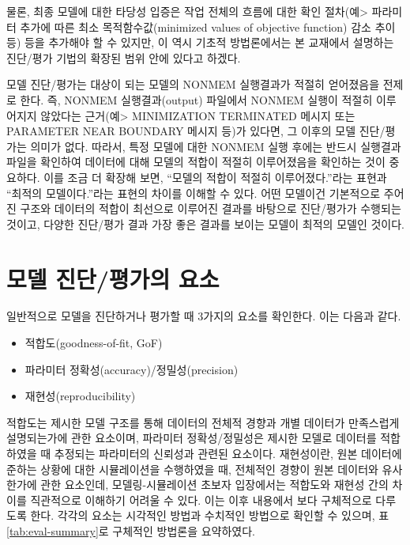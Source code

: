 \documentclass[
  10pt,
  krantz2,
  a4paper]{krantz}
\providecommand{\tightlist}{%
  \setlength{\itemsep}{0pt}\setlength{\parskip}{0pt}}
\theoremstyle{definition}
\theoremstyle{definition}
\theoremstyle{definition}
\theoremstyle{remark}
\begin{document}
물론, 최종 모델에 대한 타당성 입증은 작업 전체의 흐름에 대한 확인 절차(예\textgreater{} 파라미터 추가에 따른 최소 목적함수값(minimized values of objective function) 감소 추이 등) 등을 추가해야 할 수 있지만, 이 역시 기초적 방법론에서는 본 교재에서 설명하는 진단/평가 기법의 확장된 범위 안에 있다고 하겠다.

모델 진단/평가는 대상이 되는 모델의 NONMEM 실행결과가 적절히 얻어졌음을 전제로 한다. 즉, NONMEM 실행결과(output) 파일에서 NONMEM 실행이 적절히 이루어지지 않았다는 근거(예\textgreater{} MINIMIZATION TERMINATED 메시지 또는 PARAMETER NEAR BOUNDARY 메시지 등)가 있다면, 그 이후의 모델 진단/평가는 의미가 없다. 따라서, 특정 모델에 대한 NONMEM 실행 후에는 반드시 실행결과 파일을 확인하여 데이터에 대해 모델의 적합이 적절히 이루어졌음을 확인하는 것이 중요하다. 이를 조금 더 확장해 보면, ``모델의 적합이 적절히 이루어졌다.''라는 표현과 ``최적의 모델이다.''라는 표현의 차이를 이해할 수 있다. 어떤 모델이건 기본적으로 주어진 구조와 데이터의 적합이 최선으로 이루어진 결과를 바탕으로 진단/평가가 수행되는 것이고, 다양한 진단/평가 결과 가장 좋은 결과를 보이는 모델이 최적의 모델인 것이다.

\hypertarget{uxbaa8uxb378-uxc9c4uxb2e8uxd3c9uxac00uxc758-uxc694uxc18c}{%
\section{모델 진단/평가의 요소}\label{uxbaa8uxb378-uxc9c4uxb2e8uxd3c9uxac00uxc758-uxc694uxc18c}}

일반적으로 모델을 진단하거나 평가할 때 3가지의 요소를 확인한다. 이는 다음과 같다.

\begin{itemize}
\tightlist
\item
  적합도(goodness-of-fit, GoF)
\item
  파라미터 정확성(accuracy)/정밀성(precision)
\item
  재현성(reproducibility)
\end{itemize}

적합도는 제시한 모델 구조를 통해 데이터의 전체적 경향과 개별 데이터가 만족스럽게 설명되는가에 관한 요소이며, 파라미터 정확성/정밀성은 제시한 모델로 데이터를 적합하였을 때 추정되는 파라미터의 신뢰성과 관련된 요소이다. 재현성이란, 원본 데이터에 준하는 상황에 대한 시뮬레이션을 수행하였을 때, 전체적인 경향이 원본 데이터와 유사한가에 관한 요소인데, 모델링-시뮬레이션 초보자 입장에서는 적합도와 재현성 간의 차이를 직관적으로 이해하기 어려울 수 있다. 이는 이후 내용에서 보다 구체적으로 다루도록 한다. 각각의 요소는 시각적인 방법과 수치적인 방법으로 확인할 수 있으며, 표 \ref{tab:eval-summary}로 구체적인 방법론을 요약하였다.
\end{document}
